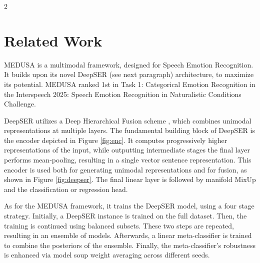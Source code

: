 \documentclass[10pt]{article}
\begin{document}
\begin{multicols}{2}
\section{Related Work}
\par MEDUSA \cite{medusa} is a multimodal framework, designed for Speech Emotion Recognition. It builds upon its novel DeepSER (see next paragraph) architecture, to maximize its potential. MEDUSA ranked 1st in Task 1: Categorical Emotion Recognition in the Interspeech 2025: Speech Emotion Recognition in Naturalistic Conditions Challenge. 
\par DeepSER utilizes a Deep Hierarchical Fusion scheme \cite{DHF}, which combines unimodal representations at multiple layers. The fundamental building block of DeepSER is the encoder depicted in Figure \ref{fig:enc}. It computes progressively higher representations of the input, while outputting intermediate stages the final layer performs mean-pooling, resulting in a single vector sentence representation. This encoder is used both for generating unimodal representations and for fusion, as shown in Figure \ref{fig:deepser}. The final linear layer is followed by manifold MixUp \cite{manifold-mixup} and the classification or regression head.
\par As for the MEDUSA framework, it trains the DeepSER model, using a four stage strategy. Initially, a DeepSER instance is trained on the full dataset. Then, the training is continued using balanced subsets. These two steps are repeated, resulting in an ensemble of models. Afterwards, a linear meta-classifier is trained to combine the posteriors of the ensemble. Finally, the meta-classifier’s robustness is enhanced via model soup weight averaging \cite{modelsoup} across different seeds.


\end{multicols}
\end{document}
